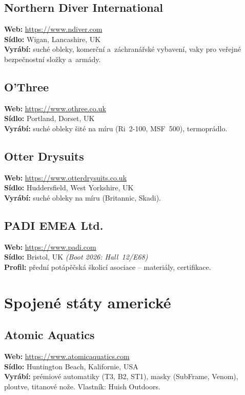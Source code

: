 \documentclass[11pt,a4paper]{article}
\begin{document}
\subsection{Northern Diver International}
\textbf{Web:} \url{https://www.ndiver.com} \\
\textbf{Sídlo:} Wigan, Lancashire, UK \\
\textbf{Vyrábí:} suché obleky, komerční a~záchranářské vybavení, vaky pro veřejné bezpečnostní složky a~armády.

\subsection{O'Three}
\textbf{Web:} \url{https://www.othree.co.uk} \\
\textbf{Sídlo:} Portland, Dorset, UK \\
\textbf{Vyrábí:} suché obleky šité na míru (Ri~2-100, MSF~500), termoprádlo.

\subsection{Otter Drysuits}
\textbf{Web:} \url{https://www.otterdrysuits.co.uk} \\
\textbf{Sídlo:} Huddersfield, West Yorkshire, UK \\
\textbf{Vyrábí:} suché obleky na míru (Britannic, Skadi).

\subsection{PADI EMEA Ltd.}
\textbf{Web:} \url{https://www.padi.com} \\
\textbf{Sídlo:} Bristol, UK \quad\emph{(Boot 2026: Hall~12/E68)} \\
\textbf{Profil:} přední potápěčská školicí asociace -- materiály, certifikace.

\section{Spojené státy americké}

\subsection{Atomic Aquatics}
\textbf{Web:} \url{https://www.atomicaquatics.com} \\
\textbf{Sídlo:} Huntington Beach, Kalifornie, USA \\
\textbf{Vyrábí:} prémiové automatiky (T3, B2, ST1), masky (SubFrame, Venom), ploutve, titanové nože. Vlastník: Huish Outdoors.
\end{document}
